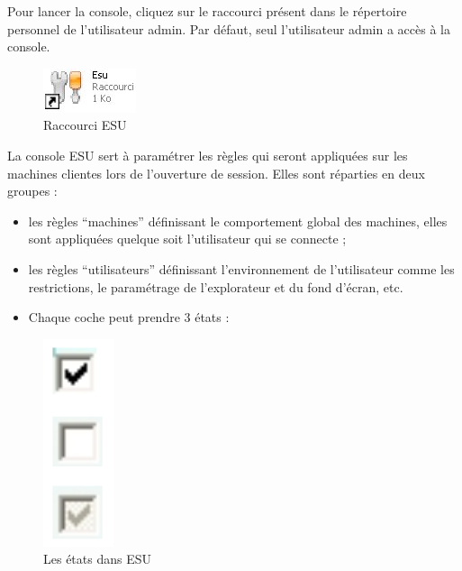 \documentclass{article}
\makeatletter
\def\maxwidth{\ifdim\Gin@nat@width>\linewidth\linewidth
\else\Gin@nat@width\fi}
\let\Oldincludegraphics\includegraphics
\renewcommand{\includegraphics}[1]{\Oldincludegraphics[width=\maxwidth]{#1}}
\makeatother
\begin{document}
Pour lancer la console, cliquez sur le raccourci présent dans le
répertoire personnel de l'utilisateur admin. Par défaut, seul
l'utilisateur admin a accès à la console.

\begin{figure}[htbp]
\centering
\includegraphics{scribe_html_5a76214.jpg}
\caption{Raccourci ESU}
\end{figure}

La console ESU sert à paramétrer les règles qui seront appliquées sur
les machines clientes lors de l'ouverture de session. Elles sont
réparties en deux groupes :

\begin{itemize}
\item
  les règles ``machines'' définissant le comportement global des
  machines, elles sont appliquées quelque soit l'utilisateur qui se
  connecte ;
\item
  les règles ``utilisateurs'' définissant l'environnement de
  l'utilisateur comme les restrictions, le paramétrage de l'explorateur
  et du fond d'écran, etc.
\item
  Chaque coche peut prendre 3 états :
\end{itemize}
\begin{figure}[htbp]
\centering
\includegraphics{scribe_html_4d04a591.png}
\caption{Les états dans ESU}
\end{figure}
\end{document}
